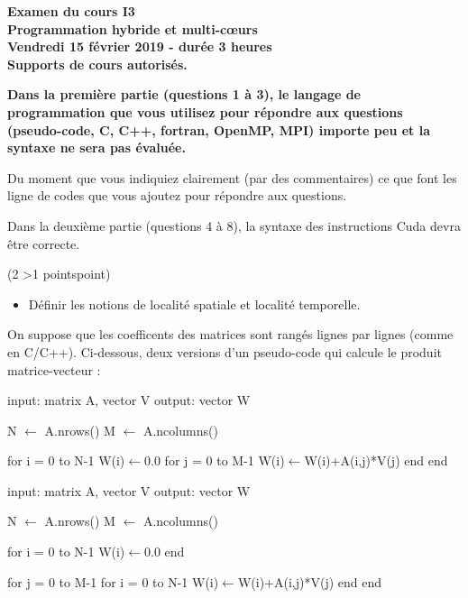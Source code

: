 \documentclass[12pt]{report}
\newcounter{cptPoints}
\newcounter{cptQuestions}
\newcommand\question[2]{\bigskip\par\addtocounter{cptQuestions}{1}\addtocounter{cptPoints}{#2}{\bf Question #1 n\textsuperscript{o} \thecptQuestions} (#2 \ifnum #2>1 points\else point\fi)\par}
\begin{document}
	\begin{center}\Large\bf
			Examen du cours I3\\
			Programmation hybride et multi-c\oe urs\\[0.4cm]
			Vendredi 15 f\'evrier 2019 - dur\'ee 3 heures\\
			Supports de cours autoris\'es.
		\end{center}
	\bigskip
	
	{\bf Dans la première partie (questions 1 \`a 3), le langage de programmation que vous utilisez pour r\'epondre aux questions (pseudo-code, C, C++, fortran, OpenMP, MPI) importe peu et la syntaxe ne sera pas \'evalu\'ee.
	
	Du moment que vous indiquiez clairement (par des commentaires) ce que font les ligne de codes que vous ajoutez pour r\'epondre aux questions.
	
	Dans la deuxi\`eme partie (questions 4 \`a 8), la syntaxe des instructions Cuda devra \^etre correcte.}
	
	\question{}2
	
	\begin{itemize}
		\item D\'efinir les notions de localit\'e spatiale et localité temporelle.
	\end{itemize}
	
	On suppose que les coefficents des matrices sont rang\'es lignes par lignes (comme en C/C++).
	Ci-dessous, deux versions d'un pseudo-code qui calcule le produit matrice-vecteur :

\vspace{-10pt}
\begin{minipage}[t]{0.5\textwidth}
\begin{algorithm}
input: matrix A, vector V
output: vector W

N $\gets$ A.nrows()
M $\gets$ A.ncolumns()

for i = 0 to N-1
   W(i)$\gets$0.0
   for j = 0 to M-1
      W(i)$\gets$W(i)+A(i,j)*V(j)
   end
end       
\end{algorithm}
\end{minipage}
\begin{minipage}[t]{0.5\textwidth}
\begin{algorithm}
input: matrix A, vector V
output: vector W

N $\gets$ A.nrows()
M $\gets$ A.ncolumns()

for i = 0 to N-1
   W(i)$\gets$0.0
end

for j = 0 to M-1
   for i = 0 to N-1
       W(i)$\gets$W(i)+A(i,j)*V(j)
   end
end       
\end{algorithm}
\end{minipage}
\end{document}
